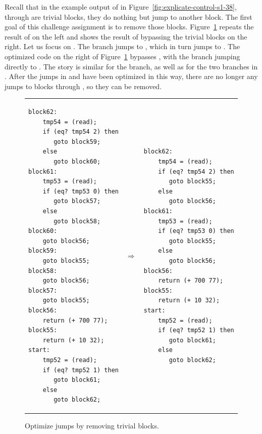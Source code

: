 \documentclass[11pt]{book}
\begin{document}
Recall that in the example output of  in
Figure~\ref{fig:explicate-control-s1-38},  through
 are trivial blocks, they do nothing but jump to another
block. The first goal of this challenge assignment is to remove those
blocks. Figure~\ref{fig:optimize-jumps} repeats the result of
 on the left and shows the result of bypassing
the trivial blocks on the right. Let us focus on .  The
 branch jumps to , which in turn jumps to
. The optimized code on the right of
Figure~\ref{fig:optimize-jumps} bypasses , with the
 branch jumping directly to . The story is
similar for the  branch, as well as for the two branches in
. After the jumps in  and 
have been optimized in this way, there are no longer any jumps to
blocks  through , so they can be removed.

\begin{figure}[tbp]
\begin{tabular}{lll}
\begin{minipage}{0.4\textwidth}
\begin{lstlisting}
block62:
    tmp54 = (read);
    if (eq? tmp54 2) then
       goto block59;
    else
       goto block60;
block61:
    tmp53 = (read);
    if (eq? tmp53 0) then
       goto block57;
    else
       goto block58;
block60:
    goto block56;
block59:
    goto block55;
block58:
    goto block56;
block57:
    goto block55;
block56:
    return (+ 700 77);
block55:
    return (+ 10 32);
start:
    tmp52 = (read);
    if (eq? tmp52 1) then
       goto block61;
    else
       goto block62;
\end{lstlisting}
\end{minipage}
&
$\Rightarrow$
&
\begin{minipage}{0.55\textwidth}
\begin{lstlisting}
block62:
    tmp54 = (read);
    if (eq? tmp54 2) then
       goto block55;
    else
       goto block56;
block61:
    tmp53 = (read);
    if (eq? tmp53 0) then
       goto block55;
    else
       goto block56;
block56:
    return (+ 700 77);
block55:
    return (+ 10 32);
start:
    tmp52 = (read);
    if (eq? tmp52 1) then
       goto block61;
    else
       goto block62;
\end{lstlisting}
\end{minipage}
\end{tabular}
\caption{Optimize jumps by removing trivial blocks.}
\label{fig:optimize-jumps}
\end{figure}
\end{document}
